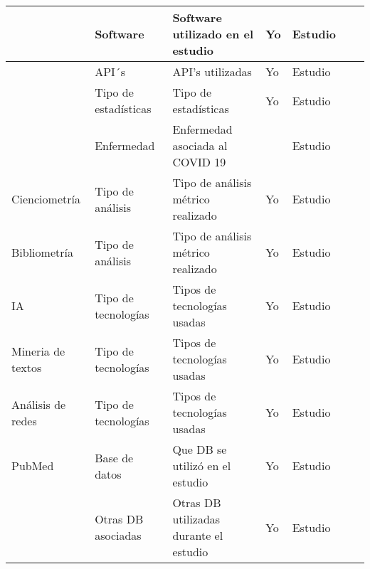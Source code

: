 \begin{longtable}{|p{2cm}|p{2cm}|p{2cm}|p{1.2cm}|p{1.9cm}|p{1.5cm}|p{2.1cm}|}
                  & Software                   & Software utilizado en el estudio         & Yo             & Estudio          &                &                                                     \\ \hline
                  & API´s                      & API's utilizadas                         & Yo             & Estudio          &                &                                                     \\ \hline
                  & Tipo de estadísticas       & Tipo de estadísticas                     & Yo             & Estudio          &                &                                                     \\ \hline
                  & Enfermedad                 & Enfermedad asociada al COVID 19          &                & Estudio          &                &                                                     \\ \hline
Cienciometría     & Tipo de análisis           & Tipo de análisis métrico realizado       & Yo             & Estudio          &                &                                                     \\ \hline
Bibliometría      & Tipo de análisis           & Tipo de análisis métrico realizado       & Yo             & Estudio          &                &                                                     \\ \hline
IA                & Tipo de tecnologías        & Tipos de tecnologías usadas              & Yo             & Estudio          &                &                                                     \\ \hline
Mineria de textos & Tipo de tecnologías        & Tipos de tecnologías usadas              & Yo             & Estudio          &                &                                                     \\ \hline
Análisis de redes & Tipo de tecnologías        & Tipos de tecnologías usadas              & Yo             & Estudio          &                &                                                     \\ \hline
PubMed            & Base de datos              & Que DB se utilizó en el estudio          & Yo             & Estudio          &                &                                                     \\ \hline
                  & Otras DB asociadas         & Otras DB utilizadas durante el estudio   & Yo             & Estudio          &                &                                                     \\ \hline

\end{longtable}

